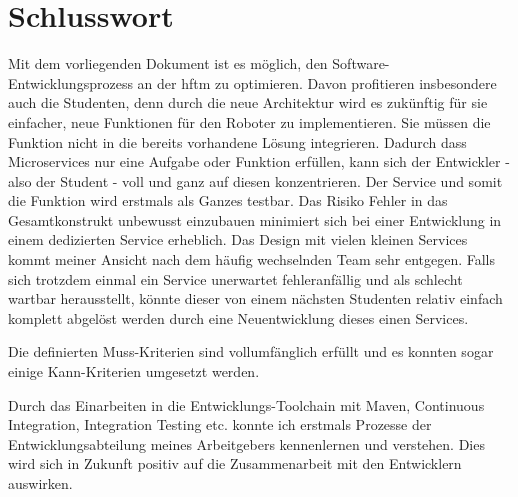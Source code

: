 \chapter{Schlusswort}
Mit dem vorliegenden Dokument ist es möglich, den Software-Entwicklungsprozess an der \acrshort{hftm} zu optimieren. Davon profitieren  insbesondere auch die Studenten, denn durch die neue Architektur wird es zukünftig für sie einfacher, neue Funktionen für den Roboter zu implementieren. Sie müssen die Funktion nicht in die bereits vorhandene Lösung integrieren. Dadurch dass Microservices nur eine Aufgabe oder Funktion erfüllen, kann sich der Entwickler - also der Student - voll und ganz auf diesen konzentrieren. Der Service und somit die Funktion wird erstmals als Ganzes testbar. Das Risiko Fehler in das Gesamtkonstrukt unbewusst einzubauen minimiert sich bei einer Entwicklung in einem dedizierten Service erheblich. Das Design mit vielen kleinen Services kommt meiner Ansicht nach dem häufig wechselnden Team sehr entgegen. Falls sich trotzdem einmal ein Service unerwartet fehleranfällig und als schlecht wartbar herausstellt, könnte dieser von einem nächsten Studenten relativ einfach komplett abgelöst werden durch eine Neuentwicklung dieses einen Services.

Die definierten Muss-Kriterien sind vollumfänglich erfüllt und es konnten sogar einige Kann-Kriterien umgesetzt werden.

Durch das Einarbeiten in die Entwicklungs-Toolchain mit Maven, Continuous Integration, Integration Testing etc. konnte ich erstmals Prozesse der Entwicklungsabteilung meines Arbeitgebers kennenlernen und verstehen. Dies wird sich in Zukunft positiv auf die Zusammenarbeit mit den Entwicklern auswirken.